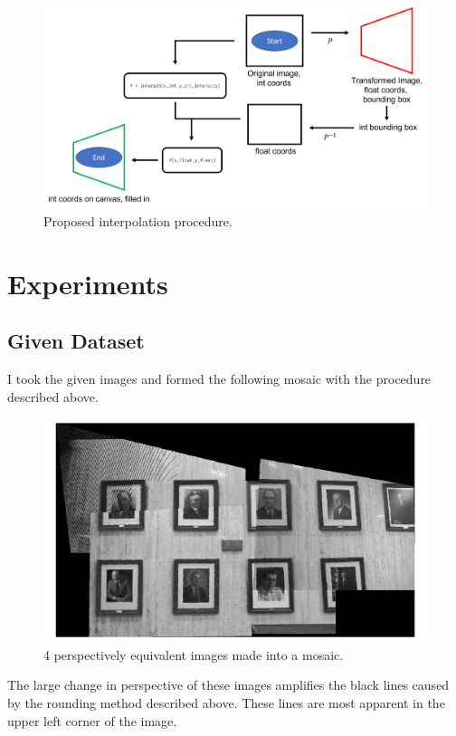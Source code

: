 \documentclass[]{article}
\begin{document}
\begin{figure}[H]
	\centering
	\includegraphics[width=6.5in]{test_images/interp_method.png}
	\caption{Proposed interpolation procedure.}
\end{figure}

\newpage

\section{Experiments}	
	\subsection{Given Dataset}
	I took the given images and formed the following mosaic with the procedure described above.
	
	\begin{figure}[H]
		\centering
		\includegraphics[width=6.5in]{test_images/hist_match.png}
		\caption{4 perspectively equivalent images made into a mosaic.}
	\end{figure}
	
	The large change in perspective of these images amplifies the black lines caused by the rounding method described above. These lines are most apparent in the upper left corner of the image.
	
\end{document}
